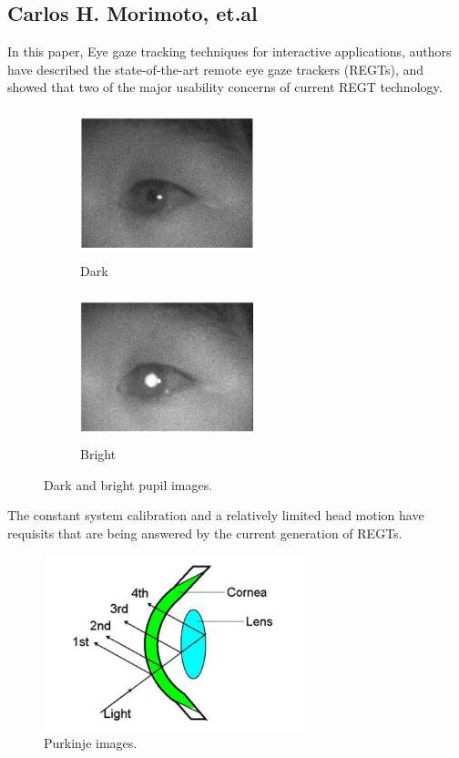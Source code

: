 \subsection{Carlos H. Morimoto, et.al \cite{15}}

In this paper, Eye gaze tracking techniques for interactive applications, authors have described the state-of-the-art remote eye gaze trackers (REGTs), and showed that two of the major usability concerns of current REGT technology. 

\begin{figure}[!hbt]
	\begin{subfigure}{.5\textwidth}
	  \centering
	  \includegraphics[width=2in,height=1.7in]{carlos.png}
	  \caption{Dark}
	  \label{carlos1}
	\end{subfigure}
	\begin{subfigure}{.5\textwidth}
	  \centering
	  \includegraphics[width=2in,height=1.7in]{carlos2.png}
	  \caption{Bright}
	  \label{carlos2}
	\end{subfigure}
	\caption{Dark and bright pupil images.}
\end{figure}

The constant system calibration and a relatively limited head motion have requisits that are being answered by the current generation of REGTs.

\begin{figure}[!hbt]
  \centering
  \includegraphics[width=3in,height=2in]{carlos3.png}
  \caption{Purkinje images.}
  \label{carlos3}
\end{figure}

